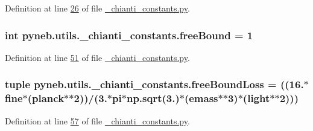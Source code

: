 Definition at line \hyperlink{__chianti__constants_8py_source_l00026}{26} of file \hyperlink{__chianti__constants_8py_source}{\+\_\+chianti\+\_\+constants.\+py}.

\hypertarget{namespacepyneb_1_1utils_1_1__chianti__constants_a4850755bf23aaa9a52f838e54df62a7d}{}
\subsubsection[{free\+Bound}]{\setlength{\rightskip}{0pt plus 5cm}int pyneb.\+utils.\+\_\+chianti\+\_\+constants.\+free\+Bound = 1}\label{namespacepyneb_1_1utils_1_1__chianti__constants_a4850755bf23aaa9a52f838e54df62a7d}


Definition at line \hyperlink{__chianti__constants_8py_source_l00051}{51} of file \hyperlink{__chianti__constants_8py_source}{\+\_\+chianti\+\_\+constants.\+py}.

\hypertarget{namespacepyneb_1_1utils_1_1__chianti__constants_a06c463c09c59b15c44e8e6a405bd81dc}{}
\subsubsection[{free\+Bound\+Loss}]{\setlength{\rightskip}{0pt plus 5cm}tuple pyneb.\+utils.\+\_\+chianti\+\_\+constants.\+free\+Bound\+Loss = ((16.$\ast${\bf fine}$\ast$({\bf planck}$\ast$$\ast$2))/(3.$\ast${\bf pi}$\ast$np.\+sqrt(3.)$\ast$({\bf emass}$\ast$$\ast$3)$\ast$({\bf light}$\ast$$\ast$2)))}\label{namespacepyneb_1_1utils_1_1__chianti__constants_a06c463c09c59b15c44e8e6a405bd81dc}


Definition at line \hyperlink{__chianti__constants_8py_source_l00057}{57} of file \hyperlink{__chianti__constants_8py_source}{\+\_\+chianti\+\_\+constants.\+py}.

\hypertarget{namespacepyneb_1_1utils_1_1__chianti__constants_acb6e045304d6339f57d58214db1f2395}{}
